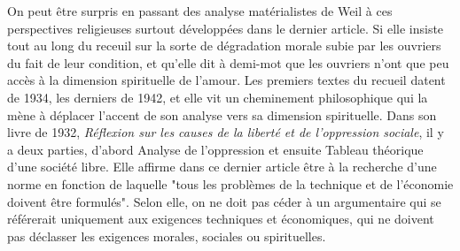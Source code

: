 \documentclass[a4paper,12pt]{book}
\begin{document}
\par On peut être surpris en passant des analyse matérialistes de Weil à ces perspectives religieuses surtout développées dans le dernier article. Si elle insiste tout au long du receuil sur la sorte de dégradation morale subie par les ouvriers du fait de leur condition, et qu'elle dit à demi-mot que les ouvriers n'ont que peu accès à la dimension spirituelle de l'amour. Les premiers textes du recueil datent de 1934, les derniers de 1942, et elle vit un cheminement philosophique qui la mène à déplacer l'accent de son analyse vers sa dimension spirituelle. Dans son livre de 1932, \textit{Réflexion sur les causes de la liberté et de l'oppression sociale}, il y a deux parties, d'abord Analyse de l'oppression et ensuite Tableau théorique d'une société libre. Elle affirme dans ce dernier article être à la recherche d'une norme en fonction de laquelle "tous les problèmes de la technique et de l'économie doivent être formulés". Selon elle, on ne doit pas céder à un argumentaire qui se référerait uniquement aux exigences techniques et économiques, qui ne doivent pas déclasser les exigences morales, sociales ou spirituelles.
\end{document}
